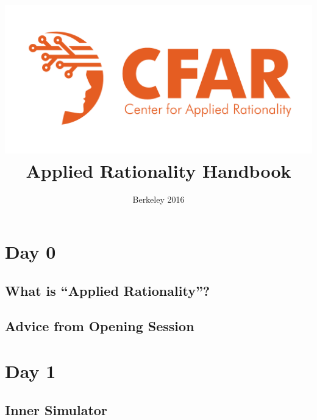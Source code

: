 \documentclass[12pt, letterpaper, openany]{book}
\title{\includegraphics[scale=0.35]{../../../img/logo.png}\\Applied Rationality Handbook}
\author{Berkeley 2016}
\date{}
\begin{document}
	\frontmatter
	\maketitle
	\mainmatter
	\tableofcontents
	\part*{Day 0}
		\chapter{What is ``Applied Rationality''?}
					
		\chapter{Advice from Opening Session}
			
			
			
			
	\part*{Day 1}
		\chapter{Inner Simulator}
			
\end{document}
